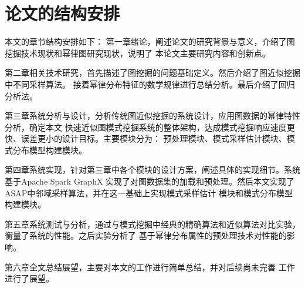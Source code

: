 \documentclass[master]{thesis-uestc}
\begin{document}
\section{论文的结构安排}
    本文的章节结构安排如下：
    第一章绪论，阐述论文的研究背景与意义，介绍了图挖掘技术现状和幂律图研究现状，说明了
本论文主要研究内容和创新点。

    第二章相关技术研究，首先描述了图挖掘的问题基础定义。然后介绍了图近似挖掘中不同采样算法。
接着幂律分布特征的数学规律进行总结分析。最后介绍了回归分析法。

    第三章系统分析与设计，分析传统图近似挖掘的系统设计，应用图数据的幂律特性分析，确定本文
快速近似图模式挖掘系统的整体架构，达成模式挖掘响应速度更快、误差更小的设计目标。主要模块分为：
预处理模块、模式采样估计模块、模式分布模型构建模块。

    第四章系统实现，针对第三章中各个模块的设计方案，阐述具体的实现细节。系统基于Apache Spark GraphX
实现了对图数据集的加载和预处理。然后本文实现了ASAP中邻域采样算法，并在这一基础上实现模式采样估计
模块和模式分布模型构建模块。

    第五章系统测试与分析，通过与模式挖掘中经典的精确算法和近似算法对比实验，衡量了系统的性能。之后实验分析了
基于幂律分布属性的预处理技术对性能的影响。

第六章全文总结展望，主要对本文的工作进行简单总结，并对后续尚未完善
工作进行了展望。

\end{document}
